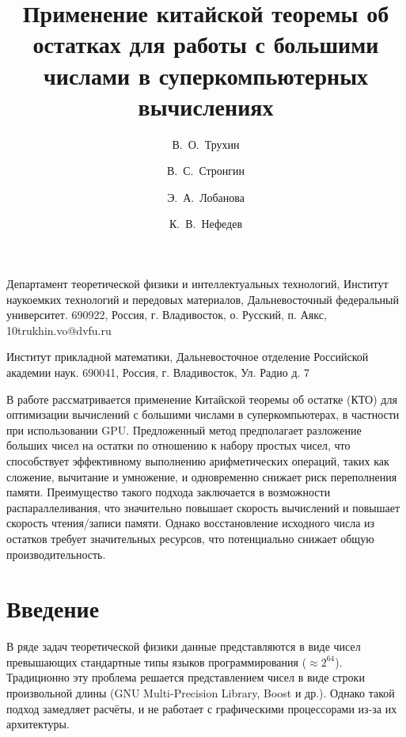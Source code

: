 \documentclass[10pt]{article}
\begin{document}
\title{Применение китайской теоремы об остатках для работы с большими числами в суперкомпьютерных вычислениях}

\author[1,2]{В.\, О.~Трухин}{Департамент теоретической физики и интеллектуальных технологий, Институт наукоемких технологий и передовых материалов, Дальневосточный федеральный университет. 690922, Россия, г. Владивосток, о. Русский, п. Аякс, 10}{trukhin.vo@dvfu.ru}
\author[1,2]{В.\, С.~Стронгин}{Институт прикладной математики, Дальневосточное отделение Российской академии наук. 690041, Россия, г. Владивосток, Ул. Радио д. 7}{}
\author[1,2]{Э.\, А.~Лобанова}{}{}
\author[1,2]{К.\, В.~Нефедев}{}{}




\makeface



\abstract В работе рассматривается применение Китайской теоремы об остатке (КТО) для оптимизации вычислений с большими числами в суперкомпьютерах, в частности при использовании GPU. Предложенный метод предполагает разложение больших чисел на остатки по отношению к набору простых чисел, что способствует эффективному выполнению арифметических операций, таких как сложение, вычитание и умножение, и одновременно снижает риск переполнения памяти. Преимущество такого подхода заключается в возможности распараллеливания, что значительно повышает скорость вычислений и повышает скорость чтения/записи памяти. Однако восстановление исходного числа из остатков требует значительных ресурсов, что потенциально снижает общую производительность.



\section*{Введение}

В ряде задач теоретической физики \cite{hao2022cambricon} данные представляются в виде чисел превышающих стандартные типы языков программирования ($\approx 2^{64}$). Традиционно эту проблема решается представлением чисел в виде строки произвольной длины (GNU Multi-Precision Library, Boost и др.). Однако такой подход замедляет расчёты, и не работает с графическими процессорами из-за их архитектуры.
\end{document}
